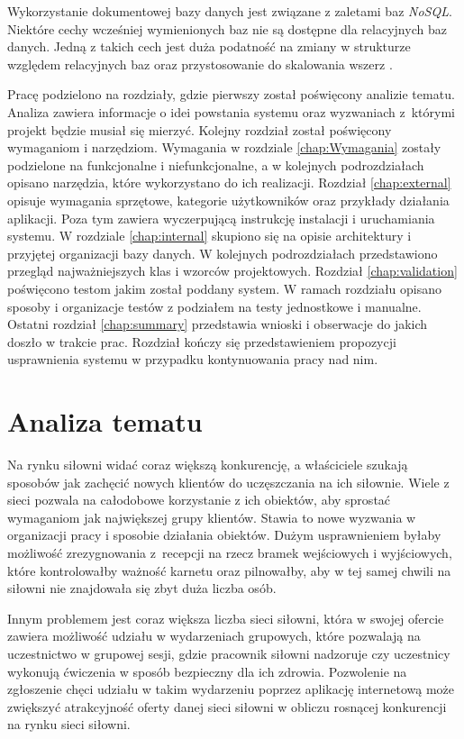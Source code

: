 \documentclass[a4paper,twoside,12pt]{book}
\begin{document}
Wykorzystanie dokumentowej bazy danych jest związane z zaletami baz \textit{NoSQL}. Niektóre cechy wcześniej wymienionych baz nie są dostępne dla relacyjnych baz danych. Jedną z takich cech jest duża podatność na zmiany w strukturze względem relacyjnych baz oraz przystosowanie do skalowania wszerz \cite{bib:noSqlVsSql}.

Pracę podzielono na rozdziały, gdzie pierwszy został poświęcony analizie tematu. Analiza zawiera informacje o idei powstania systemu oraz wyzwaniach z~którymi projekt będzie musiał się mierzyć. Kolejny rozdział został poświęcony wymaganiom i narzędziom. Wymagania w rozdziale \ref{chap:Wymagania} zostały podzielone na funkcjonalne i niefunkcjonalne, a w kolejnych podrozdziałach opisano narzędzia, które wykorzystano do ich realizacji. Rozdział \ref{chap:external} opisuje wymagania sprzętowe, kategorie użytkowników oraz przykłady działania aplikacji. Poza tym zawiera wyczerpującą instrukcję instalacji i uruchamiania systemu. W rozdziale \ref{chap:internal} skupiono się na opisie architektury i przyjętej organizacji bazy danych. W kolejnych podrozdziałach przedstawiono przegląd najważniejszych klas i wzorców projektowych. Rozdział \ref{chap:validation} poświęcono testom jakim został poddany system. W ramach rozdziału opisano sposoby i organizacje testów z podziałem na testy jednostkowe i manualne. Ostatni rozdział \ref{chap:summary} przedstawia wnioski i obserwacje do jakich doszło w trakcie prac. Rozdział kończy się przedstawieniem propozycji usprawnienia systemu w przypadku kontynuowania pracy nad nim.

\chapter{Analiza tematu}
Na rynku siłowni widać coraz większą konkurencję, a właściciele szukają sposobów jak zachęcić nowych klientów do uczęszczania na ich siłownie. Wiele z sieci pozwala na całodobowe korzystanie z ich obiektów, aby sprostać wymaganiom jak największej grupy klientów. Stawia to nowe wyzwania w organizacji pracy i sposobie działania obiektów. Dużym usprawnieniem byłaby możliwość zrezygnowania z~recepcji na rzecz bramek wejściowych i wyjściowych, które kontrolowałby ważność karnetu oraz pilnowałby, aby w tej samej chwili na siłowni nie znajdowała się zbyt duża liczba osób.

Innym problemem jest coraz większa liczba sieci siłowni, która w swojej ofercie zawiera możliwość udziału w wydarzeniach grupowych, które pozwalają na uczestnictwo w grupowej sesji, gdzie pracownik siłowni nadzoruje czy uczestnicy wykonują ćwiczenia w sposób bezpieczny dla ich zdrowia. Pozwolenie na zgłoszenie chęci udziału w takim wydarzeniu poprzez aplikację internetową może zwiększyć atrakcyjność oferty danej sieci siłowni w obliczu rosnącej konkurencji na rynku sieci siłowni.
\end{document}
